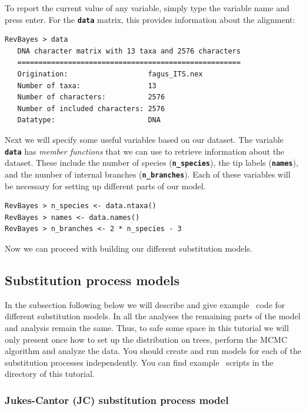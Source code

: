 \documentclass[11pt]{article}
\newcommand{\cl}[1]{{\texttt{\textbf{#1}}}}
\begin{document}
To report the current value of any variable, simply type the variable name and press enter. 
For the \cl{data} matrix, this provides information about the alignment:

{\tt \begin{snugshade*}
\begin{lstlisting}
RevBayes > data
   DNA character matrix with 13 taxa and 2576 characters
   =====================================================
   Origination:                   fagus_ITS.nex
   Number of taxa:                13
   Number of characters:          2576
   Number of included characters: 2576
   Datatype:                      DNA
\end{lstlisting}
\end{snugshade*}}


Next we will specify some useful variables based on our dataset. 
The variable \cl{data} has \textit{member functions} that we can use to retrieve information about the dataset. 
These include the number of species (\cl{n\_species}), the tip labels (\cl{names}), and the number of internal branches (\cl{n\_branches}).
Each of these variables will be necessary for setting up different parts of our model.
{\tt \begin{snugshade*}
\begin{lstlisting}
RevBayes > n_species <- data.ntaxa()
RevBayes > names <- data.names()	
RevBayes > n_branches <- 2 * n_species - 3 
\end{lstlisting}
\end{snugshade*}}

Now we can proceed with building our different substitution models.

\subsection*{Substitution process models}

In the subsection following below we will describe and give example \Rev~code for different substitution models. 
In all the analyses the remaining parts of the model and analysis remain the same.
Thus, to safe some space in this tutorial we will only present once how to set up the distribution on trees, perform the MCMC algorithm and analyze the data.
You should create and run models for each of the substitution processes independently.
You can find example \Rev~scripts in the directory of this tutorial.

\subsubsection*{Jukes-Cantor (JC)  substitution process model}
\end{document}
